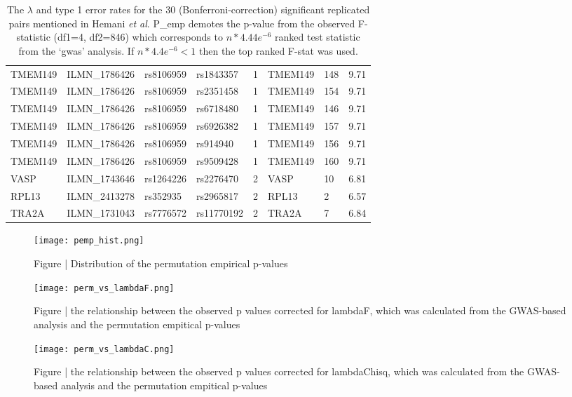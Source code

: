 \documentclass[paper=a4, fontsize=11pt]{scrartcl}         %
\numberwithin{equation}{section}                  %
\numberwithin{figure}{section}                    %
\numberwithin{table}{section}                   %
\begin{document}
\begin{table}[ht]
\begin{tabular}{llllllll}
TMEM149 & ILMN\_1786426 & rs8106959 & rs1843357 & 1 & TMEM149 & 148 & 9.71 \\ 
TMEM149 & ILMN\_1786426 & rs8106959 & rs2351458 & 1 & TMEM149 & 154 & 9.71 \\ 
TMEM149 & ILMN\_1786426 & rs8106959 & rs6718480 & 1 & TMEM149 & 146 & 9.71 \\ 
TMEM149 & ILMN\_1786426 & rs8106959 & rs6926382 & 1 & TMEM149 & 157 & 9.71 \\ 
TMEM149 & ILMN\_1786426 & rs8106959 & rs914940 & 1 & TMEM149 & 156 & 9.71 \\ 
TMEM149 & ILMN\_1786426 & rs8106959 & rs9509428 & 1 & TMEM149 & 160 & 9.71 \\ 
VASP & ILMN\_1743646 & rs1264226 & rs2276470 & 2 & VASP & 10 & 6.81 \\ 
RPL13 & ILMN\_2413278 & rs352935 & rs2965817 & 2 & RPL13 & 2 & 6.57 \\ 
TRA2A & ILMN\_1731043 & rs7776572 & rs11770192 & 2 & TRA2A & 7 & 6.84 \\ 
   \hline
\end{tabular}
\caption*{The $\lambda$ and type 1 error rates for the 30 (Bonferroni-correction) significant replicated pairs mentioned in Hemani \emph{et al}. P\_emp demotes the p-value from the observed F-statistic (df1=4, df2=846) which corresponds to $n*4.44e^{-6}$ ranked test statistic from the ‘gwas’ analysis. If $n*4.4e^{-6} < 1$ then the top ranked F-stat was used.  }
\end{table}


\newpage
\begin{figure}[H]
\centering
\texttt{[image: pemp\_hist.png]}
\caption*{Figure | Distribution of the permutation empirical p-values}
\end{figure}

\newpage

\begin{figure}[H]
\centering
\texttt{[image: perm\_vs\_lambdaF.png]}
\caption*{Figure | the relationship between the observed p values corrected for lambdaF, which was calculated from the GWAS-based analysis and the permutation empitical p-values}
\end{figure}

\begin{figure}[H]
\centering
\texttt{[image: perm\_vs\_lambdaC.png]}
\caption*{Figure | the relationship between the observed p values corrected for lambdaChisq, which was calculated from the GWAS-based analysis and the permutation empitical p-values}
\end{figure}
\end{document}
